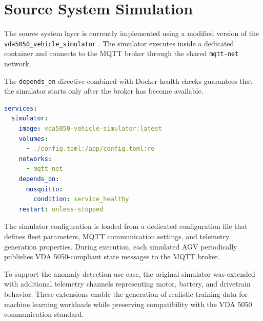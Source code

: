 \section{Source System Simulation} 
\label{sec:source_system_simulation} 
The source system layer is currently implemented using a modified version of the \texttt{vda5050\_vehicle\_simulator} \cite{bostanciVda5050}. The simulator executes inside a dedicated container and connects to the MQTT broker through the shared \texttt{mqtt-net} network. 

The \texttt{depends\_on} directive combined with Docker health checks guarantees that the simulator starts only after the broker has become available. 

\begin{lstlisting}[language=yaml, caption={VDA5050 Simulator Docker Compose}, label={lst:vda5050-simulator-docker-compose}, basicstyle=\ttfamily\small, breaklines=true]
services:
  simulator:
    image: vda5050-vehicle-simulator:latest
    volumes:
      - ./config.toml:/app/config.toml:ro
    networks:
      - mqtt-net
    depends_on:
      mosquitto:
        condition: service_healthy
    restart: unless-stopped
\end{lstlisting}

The simulator configuration is loaded from a dedicated configuration file that defines fleet parameters, MQTT communication settings, and telemetry generation properties. During execution, each simulated AGV periodically publishes VDA 5050-compliant state messages to the MQTT broker. 

To support the anomaly detection use case, the original simulator was extended with additional telemetry channels representing motor, battery, and drivetrain behavior. These extensions enable the generation of realistic training data for machine learning workloads while preserving compatibility with the VDA 5050 communication standard.

